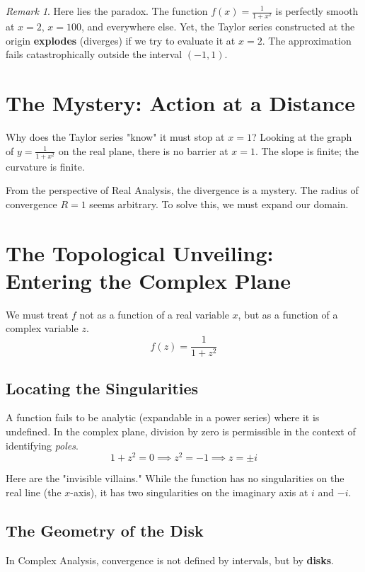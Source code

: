 \documentclass[11pt, letterpaper]{article}
\theoremstyle{definition}
\theoremstyle{remark}
\newtheorem{remark}{Remark}
\begin{document}
\begin{remark}
    Here lies the paradox. The function $f(x) = \frac{1}{1+x^2}$ is perfectly smooth at $x=2$, $x=100$, and everywhere else. Yet, the Taylor series constructed at the origin \textbf{explodes} (diverges) if we try to evaluate it at $x=2$. The approximation fails catastrophically outside the interval $(-1, 1)$.
\end{remark}

\section{The Mystery: Action at a Distance}

Why does the Taylor series "know" it must stop at $x=1$? 
Looking at the graph of $y = \frac{1}{1+x^2}$ on the real plane, there is no barrier at $x=1$. The slope is finite; the curvature is finite. 

From the perspective of Real Analysis, the divergence is a mystery. The radius of convergence $R=1$ seems arbitrary. To solve this, we must expand our domain.

\section{The Topological Unveiling: Entering the Complex Plane}

We must treat $f$ not as a function of a real variable $x$, but as a function of a complex variable $z$.
\begin{equation}
    f(z) = \frac{1}{1+z^2}
\end{equation}

\subsection{Locating the Singularities}
A function fails to be analytic (expandable in a power series) where it is undefined. In the complex plane, division by zero is permissible in the context of identifying \textit{poles}.
\begin{equation}
    1 + z^2 = 0 \implies z^2 = -1 \implies z = \pm i
\end{equation}

Here are the "invisible villains." While the function has no singularities on the real line (the $x$-axis), it has two singularities on the imaginary axis at $i$ and $-i$.

\subsection{The Geometry of the Disk}
In Complex Analysis, convergence is not defined by intervals, but by \textbf{disks}.
\end{document}
